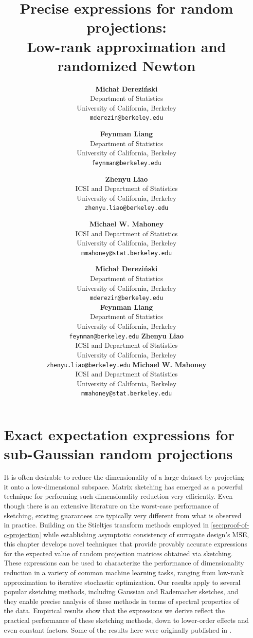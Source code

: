 \documentclass[../../thesis.tex]{subfiles}
\title{Precise expressions for random projections: \\
  Low-rank approximation and randomized Newton}
\author{
          \textbf{Micha{\l } Derezi\'{n}ski} \\
  Department of Statistics\\
  University of California, Berkeley\\
  \texttt{mderezin@berkeley.edu}\\
  \and
  \textbf{Feynman Liang} \\
  Department of Statistics\\
  University of California, Berkeley\\
  \texttt{feynman@berkeley.edu}
  \and
   \textbf{Zhenyu Liao} \\
  ICSI and Department of Statistics\\
  University of California, Berkeley\\
  \texttt{zhenyu.liao@berkeley.edu}
  \and
   \textbf{Michael W. Mahoney}\\
  ICSI and Department of Statistics\\
  University of California, Berkeley\\
  \texttt{mmahoney@stat.berkeley.edu}
}
\author{%
 \textbf{Micha{\l } Derezi\'{n}ski} \\
  Department of Statistics\\
  University of California, Berkeley\\
  \texttt{mderezin@berkeley.edu}\\
  \And
  \textbf{Feynman Liang} \\
  Department of Statistics\\
  University of California, Berkeley\\
  \texttt{feynman@berkeley.edu}
  \And
   \textbf{Zhenyu Liao} \\
  ICSI and Department of Statistics\\
  University of California, Berkeley\\
  \texttt{zhenyu.liao@berkeley.edu}
  \And
   \textbf{Michael W. Mahoney}\\
  ICSI and Department of Statistics\\
  University of California, Berkeley\\
  \texttt{mmahoney@stat.berkeley.edu}
}
\begin{document}


\chapter{Exact expectation expressions for sub-Gaussian random projections}
\label{ch:projections}

It is often desirable to reduce the dimensionality of a large dataset
by projecting it onto a low-dimensional subspace.  Matrix sketching
has emerged as a powerful technique for performing such dimensionality
reduction very efficiently. Even though there is an extensive
literature on the worst-case performance of sketching, existing
guarantees are typically very different from what is observed in
practice. Building on the Stieltjes transform methods employed
in \cref{sec:proof-of-c-projection} while establishing asymptotic
consistency of surrogate design's MSE, this chapter develops novel
techniques
that provide provably accurate expressions for the expected value of
random projection matrices obtained via sketching.  These expressions
can be used to characterize the performance of dimensionality reduction
in a variety
of common machine learning tasks, ranging from low-rank approximation
to iterative stochastic optimization.  Our results apply to several
popular sketching methods, including Gaussian and Rademacher sketches,
and they enable precise analysis of these methods in terms of spectral
properties of the data. Empirical results show that the expressions
we derive reflect the practical performance of these sketching
methods, down to lower-order effects and even constant factors.
Some of the results here were originally published in
.

\end{document}

